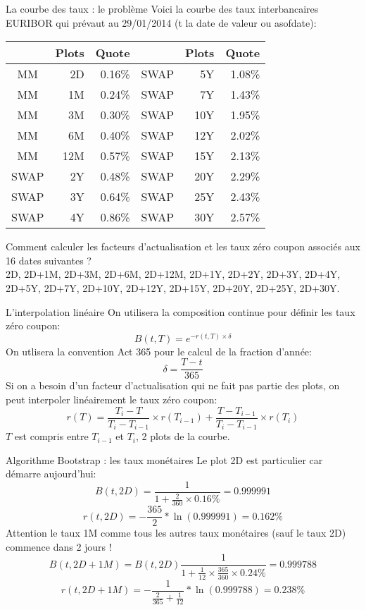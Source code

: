 \documentclass{beamer}
\begin{document}
\begin{frame}{La courbe des taux : le problème}
Voici la courbe des taux interbancaires EURIBOR qui prévaut au 29/01/2014 (t la date de valeur ou asofdate):

\begin{center}
\begin{tabular}{|c|r|r|c|r|r|}
  \hline
  & Plots & Quote & & Plots & Quote \\
  \hline
  MM & 2D & 0.16\% & SWAP & 5Y & 1.08\%\\
  MM & 1M & 0.24\% & SWAP & 7Y & 1.43\%\\
  MM & 3M & 0.30\% & SWAP & 10Y & 1.95\%\\
  MM & 6M & 0.40\% & SWAP & 12Y & 2.02\%\\
  MM & 12M & 0.57\% & SWAP & 15Y & 2.13\%\\
  SWAP & 2Y & 0.48\% & SWAP & 20Y & 2.29\%\\
  SWAP & 3Y & 0.64\% & SWAP & 25Y & 2.43\%\\
  SWAP & 4Y & 0.86\% & SWAP & 30Y & 2.57\%\\
  \hline
\end{tabular}
\end{center}
Comment calculer les facteurs d'actualisation et les taux zéro coupon associés aux 16 dates suivantes ? \\
2D, 2D+1M, 2D+3M, 2D+6M, 2D+12M, 2D+1Y, 2D+2Y, 2D+3Y, 2D+4Y, 2D+5Y, 2D+7Y, 2D+10Y, 2D+12Y, 2D+15Y, 2D+20Y, 2D+25Y, 2D+30Y.
\end{frame}

\begin{frame}{L'interpolation linéaire}
On utilisera la composition continue pour définir les taux zéro coupon:
\[
B(t,T)=e^{-r(t,T) \times \delta }	
\]
On utlisera la convention Act 365 pour le calcul de la fraction d'année:
\[
\delta = \frac{T-t}{365}
\]
Si on a besoin d'un facteur d'actualisation qui ne fait pas partie des plots, on peut interpoler linéairement le taux zéro coupon:
\[
r(T)=\frac{T_{i}-T}{T_{i}-T_{i-1}}\times r(T_{i-1})+\frac{T-T_{i-1}}{T_{i}-T_{i-1}} \times r(T_{i})
\]
$T$ est compris entre $T_{i-1}$ et $T_{i}$, 2 plots de la courbe.
\end{frame}

\begin{frame}{Algorithme Bootstrap : les taux monétaires}
Le plot 2D est particulier car démarre aujourd'hui:\\
\[
B(t,2D)=\frac{1}{1+\frac{2}{360} \times 0.16\%}=0.999991
\]
\[r(t,2D)=-\frac{365}{2}*\ln(0.999991)=0.162\%
\]
Attention le taux 1M comme tous les autres taux monétaires (sauf le taux 2D) commence dans 2 jours !
\[
B(t,2D+1M)=B(t,2D)\frac{1}{1+\frac{1}{12} \times \frac{365}{360}  \times 0.24\%}=0.999788
\]
\[r(t,2D+1M)=-\frac{1}{\frac{2}{365}+\frac{1}{12}}*\ln(0.999788)=0.238\%
\]
\end{frame}
\end{document}
